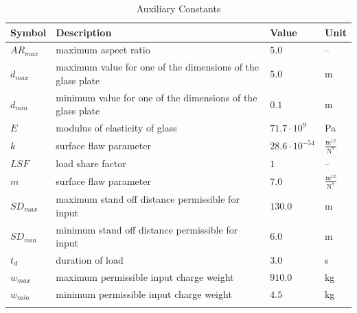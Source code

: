 \documentclass[12pt]{article}
\begin{document}
\begin{longtabu}{l X[l] l l}
\toprule
\textbf{Symbol} & \textbf{Description} & \textbf{Value} & \textbf{Unit}
\\
\midrule
\endhead
${AR_{max}}$ & maximum aspect ratio & $5.0$ & --
\\
${d_{max}}$ & maximum value for one of the dimensions of the glass plate & $5.0$ & m
\\
${d_{min}}$ & minimum value for one of the dimensions of the glass plate & $0.1$ & m
\\
$E$ & modulus of elasticity of glass & $71.7\cdot{}10^{9}$ & Pa
\\
$k$ & surface flaw parameter & $28.6\cdot{}10^{-54}$ & $\frac{\text{m}^{12}}{\text{N}^{7}}$
\\
$LSF$ & load share factor & $1$ & --
\\
$m$ & surface flaw parameter & $7.0$ & $\frac{\text{m}^{12}}{\text{N}^{7}}$
\\
${SD_{max}}$ & maximum stand off distance permissible for input & $130.0$ & m
\\
${SD_{min}}$ & minimum stand off distance permissible for input & $6.0$ & m
\\
${t_{d}}$ & duration of load & $3.0$ & s
\\
${w_{max}}$ & maximum permissible input charge weight & $910.0$ & kg
\\
${w_{min}}$ & minimum permissible input charge weight & $4.5$ & kg
\\
\bottomrule
\caption{Auxiliary Constants}
\label{Table:TAuxConsts}
\end{longtabu}
\end{document}
